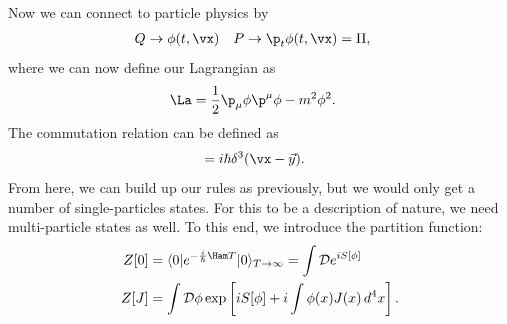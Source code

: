 \documentclass[relqm.tex]{subfiles}
\begin{document}
Now we can connect to particle physics by
\begin{align}
    Q &\to \phi(t,\vx) & P &\to \p_t\phi(t,\vx) = \Pi, 
\end{align}
where we can now define our Lagrangian as
\begin{align}
    \La &= \frac12 \p_\mu\phi\p^\mu\phi - m^2\phi^2. 
\end{align}
The commutation relation can be defined as
\begin{align}
    [\hat{\phi}(\vx),\hat{\Pi}(\vec{y})] &= i\hbar\delta^3(\vx-\vec{y}).
\end{align}
From here, we can build up our rules as previously, but we would only get a number of single-particles states. 
For this to be a description of nature, we need multi-particle states as well. 
To this end, we introduce the partition function:
\begin{align}
    Z[0] &= \langle0|e^{-\frac{i}{\hbar}\Ham T}|0\rangle_{T\to\infty} = \int\mathcal{D}e^{iS[\phi]}\\
    Z[J] &= \int \mathcal{D}\phi\exp\left[iS[\phi]+i\int\phi(x)J(x)\,d^4x\right].
\end{align}
\end{document}
